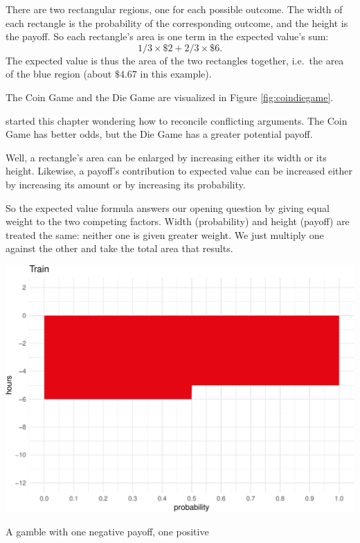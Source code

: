 \documentclass[justified]{tufte-book}
\theoremstyle{definition}
\theoremstyle{definition}
\theoremstyle{definition}
\theoremstyle{remark}
\begin{document}
There are two rectangular regions, one for each possible outcome. The
width of each rectangle is the probability of the corresponding outcome,
and the height is the payoff. So each rectangle's area is one term in
the expected value's sum: \[ 1/3 \times \$2 + 2/3 \times \$6. \] The
expected value is thus the area of the two rectangles together, i.e.~the
area of the blue region (about \(\$4.67\) in this example).

The Coin Game and the Die Game are visualized in Figure
\ref{fig:coindiegame}.

 started this chapter wondering how to reconcile
conflicting arguments. The Coin Game has better odds, but the Die Game
has a greater potential payoff.

Well, a rectangle's area can be enlarged by increasing either its width
or its height. Likewise, a payoff's contribution to expected value can
be increased either by increasing its amount or by increasing its
probability.

So the expected value formula answers our opening question by giving
equal weight to the two competing factors. Width (probability) and
height (payoff) are treated the same: neither one is given greater
weight. We just multiply one against the other and take the total area
that results.

\begin{marginfigure}
\includegraphics{_main_files/figure-latex/unnamed-chunk-93-1} \caption[A gamble with one negative payoff, one positive]{A gamble with one negative payoff, one positive}\label{fig:unnamed-chunk-93}
\end{marginfigure}
\end{document}
